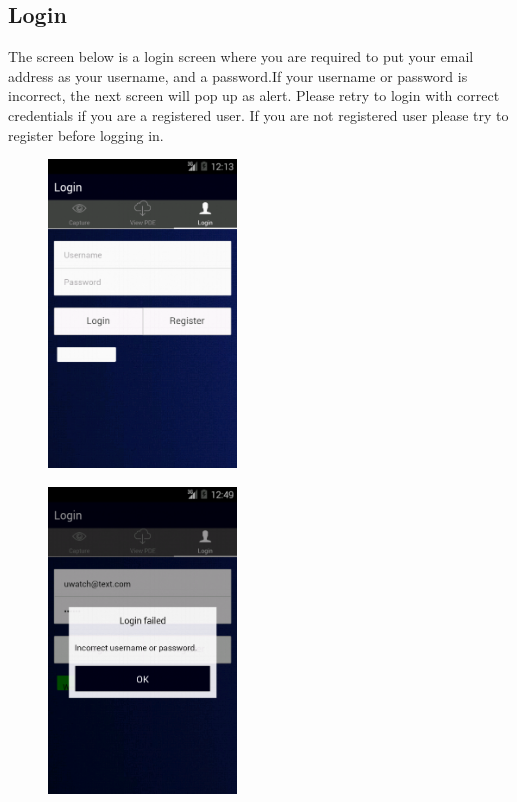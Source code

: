 \documentclass[a4paper,12pt]{article}
\begin{document}
\subsection{Login}
The screen below is a login screen where you are required to put your email address as your username, and a password.If your username or password is incorrect, the next screen will pop up as alert. Please retry to login with correct credentials if you are a registered user. If you are not registered user please try to register before logging in.
\begin{figure}[H]
\begin{center}
\includegraphics[width=50mm,scale=0.5]{images/screenshots/login.png}
\end{center}
\end{figure}
\begin{figure}[H]
\begin{center}
\includegraphics[width=50mm,scale=0.5]{images/screenshots/loginerror.png}
\end{center}
\end{figure}
\end{document}
